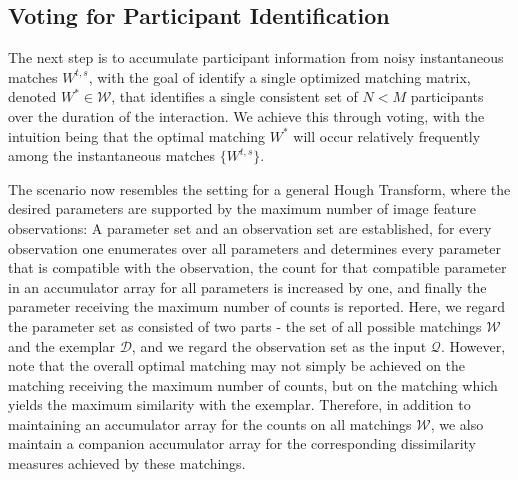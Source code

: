 \subsection{Voting for Participant Identification}
\label{vote}
\vspace{-5pt}
The next step is to accumulate participant information from noisy instantaneous matches $W^{t,s}$, with the goal of identify a single optimized matching matrix, denoted $W^{*}\in\mathcal{W}$, that identifies a single consistent set of $N<M$ participants over the duration of the interaction. We achieve this through voting, with the intuition being that the optimal matching $W^{*}$ will occur relatively frequently among the instantaneous matches $\{W^{t,s}\}$. 

The scenario now resembles the setting for a general Hough Transform, where the desired parameters are supported by the maximum number of image feature observations: A parameter set and an observation set are established, for every observation one enumerates over all parameters and determines every parameter that is compatible with the observation, the count for that compatible parameter in an accumulator array for all parameters is increased by one, and finally the parameter receiving the maximum number of counts is reported. Here, we regard the parameter set as consisted of two parts - the set of all possible matchings $\mathcal{W}$ and the exemplar $\mathcal{D}$, and we regard the observation set as the input $\mathcal{Q}$. However, note that the overall optimal matching may not simply be achieved on the matching receiving the maximum number of counts, but on the matching which yields the maximum similarity with the exemplar. Therefore, in addition to maintaining an accumulator array for the counts on all matchings $\mathcal{W}$, we also maintain a companion accumulator array for the corresponding dissimilarity measures achieved by these matchings. 

